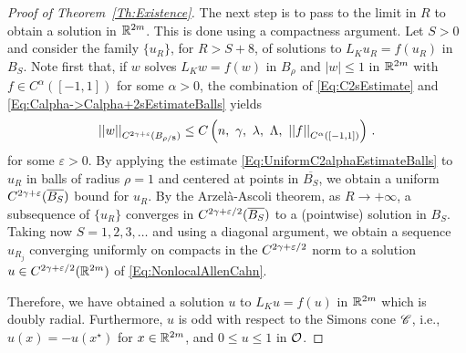 \begin{proof}[Proof of Theorem~\ref{Th:Existence}]
The next step is to pass to the limit in $R$ to obtain a solution in $\mathbb{R}^{2m}$. This is done using a compactness argument. Let $S>0$ and consider the family $\{u_R\}$, for $R> S + 8$, of solutions to $L_K u_R = f(u_R)$ in $B_{S}$. Note first that, if $w$ solves $L_K w = f(w)$ in $B_\rho$ and  $|w|\leq 1$ in $\mathbb{R}^{2m}$ with $f\in C^{\alpha}([-1,1])$ for some $\alpha > 0$, the combination of \eqref{Eq:C2sEstimate} and \eqref{Eq:Calpha->Calpha+2sEstimateBalls} yields
\begin{equation}
\label{Eq:UniformC2alphaEstimateBalls}
\norm{w}_{C^{2\s + \varepsilon}(B_{\rho/8})} \leq C \bpar{n,\ \s ,\ \lambda,\ \Lambda ,\ \norm{f}_{C^{\alpha}([-1,1])} }\,.
\end{equation}
for some $\varepsilon > 0$.  By applying the estimate \eqref{Eq:UniformC2alphaEstimateBalls} to $u_R$ in balls of radius $\rho = 1$ and centered at points in $\overline{B_{S}}$, we obtain a uniform $C^{2\gamma + \varepsilon}(\overline{B_S})$ bound for $u_R$. By the Arzelà-Ascoli theorem, as $R\to +\infty$, a subsequence of $\{u_R\}$ converges in $C^{2\gamma + \varepsilon/2}(\overline{B_S})$ to a (pointwise) solution in $B_S$. Taking now $S = 1,2,3,\ldots$ and using a diagonal argument, we obtain a sequence $u_{R_j}$ converging uniformly on compacts in the $C^{2\gamma + \varepsilon/2}$ norm to a solution $u \in C^{2\gamma + \varepsilon/2}(\mathbb{R}^{2m})$ of \eqref{Eq:NonlocalAllenCahn}.

Therefore, we have obtained a solution $u$ to $L_K u = f(u)$ in $\mathbb{R}^{2m}$ which is doubly radial. Furthermore, $u$ is odd with respect to the Simons cone $\mathscr{C}$, i.e., $u(x) = -u(x^\star)$ for $x\in \mathbb{R}^{2m}$, and $0 \leq u\leq 1$ in $\mathcal{O}$.


\end{proof}
